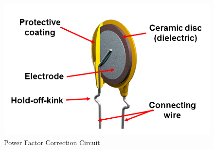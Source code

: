 \begin{figure}
\includegraphics[keepaspectratio=true,scale=.5]{./figures/parameters/powerFactor.png}
\centering
\caption{Power Factor Correction Circuit}
\label{powerFactor}
\end{figure}
